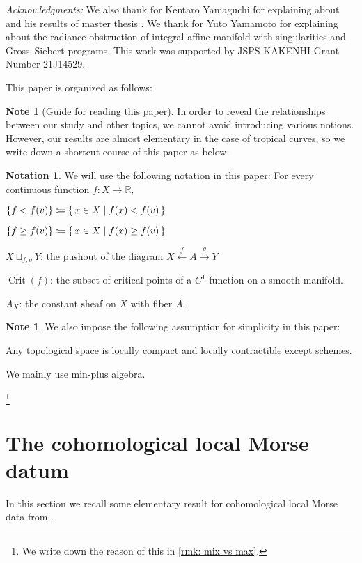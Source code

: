 \documentclass[a4paper,dvipdfmx,reqno,12pt]{amsart}
\theoremstyle{definition}
\newtheorem{Note}[Thm]{Note}
\newtheorem{Not}[Thm]{Notation}
\newcommand{\deq}{\coloneqq}
\newcommand{\R}{\mathbb{R}}%
\newcommand{\opn}[1]{\operatorname{#1}}
\newcommand{\xto}[1]{\xrightarrow{#1}}
\newcommand{\xgets}[1]{\xleftarrow{#1}}
\numberwithin{equation}{section}
\begin{document}
\textit{Acknowledgments:}
We also thank for Kentaro Yamaguchi for explaining about
\cite{MR4234675} and his results of master thesis 
\cite{yamaguchimaster}. We thank for Yuto Yamamoto for
explaining about the radiance obstruction of integral 
affine manifold with singularities and Gross--Siebert
programs.
This work was supported by JSPS KAKENHI 
Grant Number 21J14529.

This paper is organized as follows:

\begin{Note}[Guide for reading this paper]
  In order to reveal the relationships between our study
  and other topics, we cannot avoid introducing various
  notions. However, our results are almost elementary
in the case of tropical curves,
  so we write down a shortcut course of this paper as below:
\end{Note}

\begin{Not}

  We will use the following notation in this paper:
  For every continuous function $f\colon X\to \R$,

  $\{f<f(v)\}\deq \set{x\in X\mid f(x)< f(v)}$

  $\{f\geq f(v)\}\deq \set{x\in X\mid f(x)\geq f(v)}$

  $X\sqcup_{f,g}Y$: the pushout of the diagram
  $X\xgets{f} A\xto{g} Y$

  $\opn{Crit}(f)$: the subset of critical points of a
  $C^{1}$-function on a smooth manifold.

$A_X$: the constant sheaf on $X$ with fiber $A$.
\end{Not}

\begin{Note}
  We also impose the following assumption for simplicity in this paper:

  Any topological space is locally compact and locally
  contractible except schemes.


  We mainly use min-plus algebra.

  \footnote{We write down the reason of this in \cref{rmk: mix vs max}.}


\end{Note}

\section{The cohomological local Morse datum}
In this section we recall some elementary result
for cohomological local Morse data from
\cite{MR2031639,MR1299726,MR4294126}.
\end{document}
